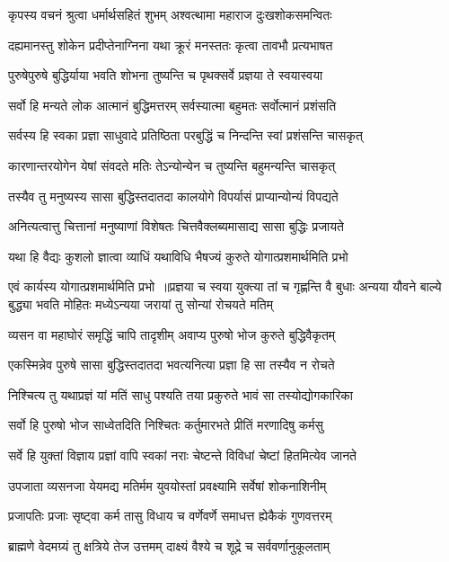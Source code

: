\twolineshloka
{कृपस्य वचनं श्रुत्वा धर्मार्थसहितं शुभम्}
{अश्वत्थामा महाराज दुःखशोकसमन्वितः}


\twolineshloka
{दह्यमानस्तु शोकेन प्रदीप्तेनाग्निना यथा}
{क्रूरं मनस्ततः कृत्वा तावभौ प्रत्यभाषत}


\twolineshloka
{पुरुषेपुरुषे बुद्धिर्याया भवति शोभना}
{तुष्यन्ति च पृथक्सर्वे प्रज्ञया ते स्वयास्वया}


\twolineshloka
{सर्वो हि मन्यते लोक आत्मानं बुद्धिमत्तरम्}
{सर्वस्यात्मा बहुमतः सर्वोत्मानं प्रशंसति}


\twolineshloka
{सर्वस्य हि स्वका प्रज्ञा साधुवादे प्रतिष्ठिता}
{परबुद्धिं च निन्दन्ति स्वां प्रशंसन्ति चासकृत्}


\twolineshloka
{कारणान्तरयोगेन येषां संवदते मतिः}
{तेऽन्योन्येन च तुष्यन्ति बहुमन्यन्ति चासकृत्}


\twolineshloka
{तस्यैव तु मनुष्यस्य सासा बुद्धिस्तदातदा}
{कालयोगे विपर्यासं प्राप्यान्योन्यं विपद्यते}


\twolineshloka
{अनित्यत्वात्तु चित्तानां मनुष्याणां विशेषतः}
{चित्तवैक्लब्यमासाद्य सासा बुद्धिः प्रजायते}


\twolineshloka
{यथा हि वैद्यः कुशलो ज्ञात्वा व्याधिं यथाविधि}
{भैषज्यं कुरुते योगात्प्रशमार्थमिति प्रभो}


एवं कार्यस्य योगात्प्रशमार्थमिति प्रभो ॥प्रज्ञया च स्वया युक्त्या तां च गृह्णन्ति वै बुधाः
\twolineshloka
{अन्यया यौवने बाल्ये बुद्ध्या भवति मोहितः}
{मध्येऽन्यया जरायां तु सोन्यां रोचयते मतिम्}


\twolineshloka
{व्यसन वा महाघोरं समृद्धिं चापि तादृशीम्}
{अवाप्य पुरुषो भोज कुरुते बुद्धिवैकृतम्}


\twolineshloka
{एकस्मिन्नेव पुरुषे सासा बुद्धिस्तदातदा}
{भवत्यनित्या प्रज्ञा हि सा तस्यैव न रोचते}


\twolineshloka
{निश्चित्य तु यथाप्रज्ञं यां मतिं साधु पश्यति}
{तया प्रकुरुते भावं सा तस्योद्योगकारिका}


\twolineshloka
{सर्वो हि पुरुषो भोज साध्वेतदिति निश्चितः}
{कर्तुमारभते प्रीतिं मरणादिषु कर्मसु}


\twolineshloka
{सर्वे हि युक्तां विज्ञाय प्रज्ञां वापि स्वकां नराः}
{चेष्टन्ते विविधां चेष्टां हितमित्येव जानते}


\twolineshloka
{उपजाता व्यसनजा येयमद्य मतिर्मम}
{युवयोस्तां प्रवक्ष्यामि सर्वेषां शोकनाशिनीम्}


\twolineshloka
{प्रजापतिः प्रजाः सृष्ट्वा कर्म तासु विधाय च}
{वर्णेवर्णे समाधत्त ह्येकैकं गुणवत्तरम्}


\twolineshloka
{ब्राह्मणे वेदमग्र्यं तु क्षत्रिये तेज उत्तमम्}
{दाक्ष्यं वैश्ये च शूद्रे च सर्ववर्णानुकूलताम्}


